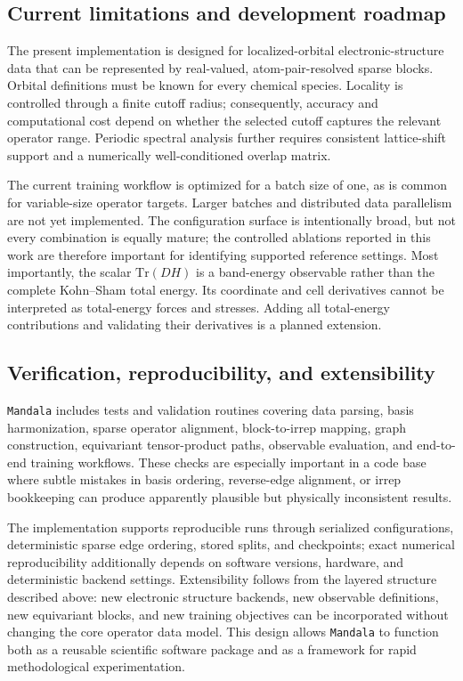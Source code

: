\documentclass[preprint,12pt,compress,numafflabel]{elsarticle}
\newcommand{\Tr}{\mathrm{Tr}}
\begin{document}
\subsection{Current limitations and development roadmap}
\label{subsec:limitations}

The present implementation is designed for localized-orbital electronic-structure data that can be represented by real-valued, atom-pair-resolved sparse blocks.
Orbital definitions must be known for every chemical species.
Locality is controlled through a finite cutoff radius; consequently, accuracy and computational cost depend on whether the selected cutoff captures the relevant operator range.
Periodic spectral analysis further requires consistent lattice-shift support and a numerically well-conditioned overlap matrix.

The current training workflow is optimized for a batch size of one, as is common for variable-size operator targets. Larger batches and distributed data parallelism are not yet implemented.
The configuration surface is intentionally broad, but not every combination is equally mature; the controlled ablations reported in this work are therefore important for identifying supported reference settings.
Most importantly, the scalar $\Tr(DH)$ is a band-energy observable rather than the complete Kohn--Sham total energy.
Its coordinate and cell derivatives cannot be interpreted as total-energy forces and stresses.
Adding all total-energy contributions and validating their derivatives is a planned extension.


\subsection{Verification, reproducibility, and extensibility}
\label{subsec:verification}

\texttt{Mandala} includes tests and validation routines covering data parsing, basis harmonization, sparse operator alignment, block-to-irrep mapping, graph construction, equivariant tensor-product paths, observable evaluation, and end-to-end training workflows.
These checks are especially important in a code base where subtle mistakes in basis ordering, reverse-edge alignment, or irrep bookkeeping can produce apparently plausible but physically inconsistent results.

The implementation supports reproducible runs through serialized configurations, deterministic sparse edge ordering, stored splits, and checkpoints; exact numerical reproducibility additionally depends on software versions, hardware, and deterministic backend settings.
Extensibility follows from the layered structure described above: new electronic structure backends, new observable definitions, new equivariant blocks, and new training objectives can be incorporated without changing the core operator data model.
This design allows \texttt{Mandala} to function both as a reusable scientific software package and as a framework for rapid methodological experimentation.
\end{document}
